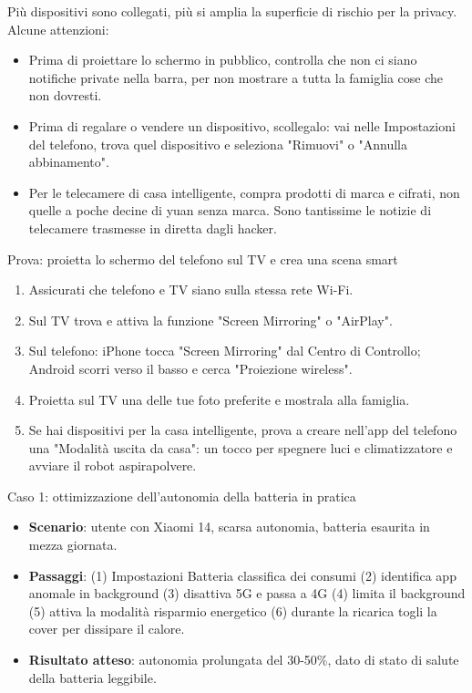 
Più dispositivi sono collegati, più si amplia la superficie di rischio per la privacy. Alcune attenzioni:

\begin{itemize}
  \item Prima di proiettare lo schermo in pubblico, controlla che non ci siano notifiche private nella barra, per non mostrare a tutta la famiglia cose che non dovresti.
  \item Prima di regalare o vendere un dispositivo, scollegalo: vai nelle Impostazioni del telefono, trova quel dispositivo e seleziona "Rimuovi" o "Annulla abbinamento".
  \item Per le telecamere di casa intelligente, compra prodotti di marca e cifrati, non quelle a poche decine di yuan senza marca. Sono tantissime le notizie di telecamere trasmesse in diretta dagli hacker.
\end{itemize}

\begin{tcbpractice}{Prova: proietta lo schermo del telefono sul TV e crea una scena smart}
\begin{enumerate}
  \item Assicurati che telefono e TV siano sulla stessa rete Wi-Fi.
  \item Sul TV trova e attiva la funzione "Screen Mirroring" o "AirPlay".
  \item Sul telefono: iPhone tocca "Screen Mirroring" dal Centro di Controllo; Android scorri verso il basso e cerca "Proiezione wireless".
  \item Proietta sul TV una delle tue foto preferite e mostrala alla famiglia.
  \item Se hai dispositivi per la casa intelligente, prova a creare nell'app del telefono una "Modalità uscita da casa": un tocco per spegnere luci e climatizzatore e avviare il robot aspirapolvere.
\end{enumerate}

\end{tcbpractice}

\begin{tcbinfo}{Caso 1: ottimizzazione dell'autonomia della batteria in pratica}
\begin{itemize}
  \item \textbf{Scenario}: utente con Xiaomi 14, scarsa autonomia, batteria esaurita in mezza giornata.
  \item \textbf{Passaggi}: (1) Impostazioni Batteria classifica dei consumi (2) identifica app anomale in background (3) disattiva 5G e passa a 4G (4) limita il background (5) attiva la modalità risparmio energetico (6) durante la ricarica togli la cover per dissipare il calore.
  \item \textbf{Risultato atteso}: autonomia prolungata del 30-50\%, dato di stato di salute della batteria leggibile.
\end{itemize}

\end{tcbinfo}
